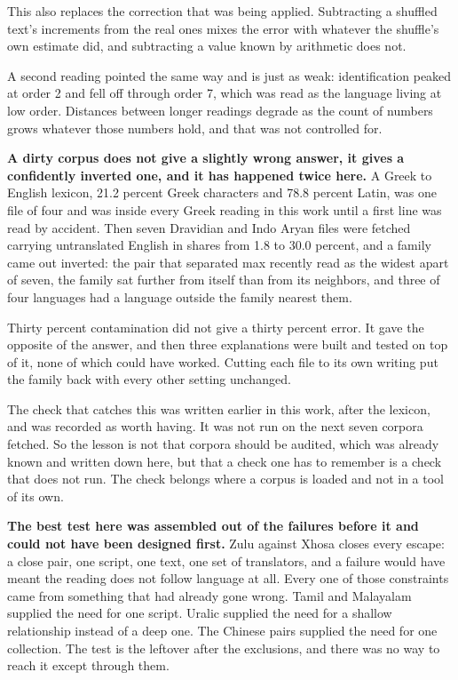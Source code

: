 This also replaces the correction that was being applied. Subtracting a shuffled text's increments from the real ones mixes the error with whatever the shuffle's own estimate did, and subtracting a value known by arithmetic does not.

A second reading pointed the same way and is just as weak: identification peaked at order 2 and fell off through order 7, which was read as the language living at low order. Distances between longer readings degrade as the count of numbers grows whatever those numbers hold, and that was not controlled for.

\textbf{A dirty corpus does not give a slightly wrong answer, it gives a confidently inverted one, and it has happened twice here.} A Greek to English lexicon, 21.2 percent Greek characters and 78.8 percent Latin, was one file of four and was inside every Greek reading in this work until a first line was read by accident. Then seven Dravidian and Indo Aryan files were fetched carrying untranslated English in shares from 1.8 to 30.0 percent, and a family came out inverted: the pair that separated max recently read as the widest apart of seven, the family sat further from itself than from its neighbors, and three of four languages had a language outside the family nearest them.

Thirty percent contamination did not give a thirty percent error. It gave the opposite of the answer, and then three explanations were built and tested on top of it, none of which could have worked. Cutting each file to its own writing put the family back with every other setting unchanged.

The check that catches this was written earlier in this work, after the lexicon, and was recorded as worth having. It was not run on the next seven corpora fetched. So the lesson is not that corpora should be audited, which was already known and written down here, but that a check one has to remember is a check that does not run. The check belongs where a corpus is loaded and not in a tool of its own.

\textbf{The best test here was assembled out of the failures before it and could not have been designed first.} Zulu against Xhosa closes every escape: a close pair, one script, one text, one set of translators, and a failure would have meant the reading does not follow language at all. Every one of those constraints came from something that had already gone wrong. Tamil and Malayalam supplied the need for one script. Uralic supplied the need for a shallow relationship instead of a deep one. The Chinese pairs supplied the need for one collection. The test is the leftover after the exclusions, and there was no way to reach it except through them.

